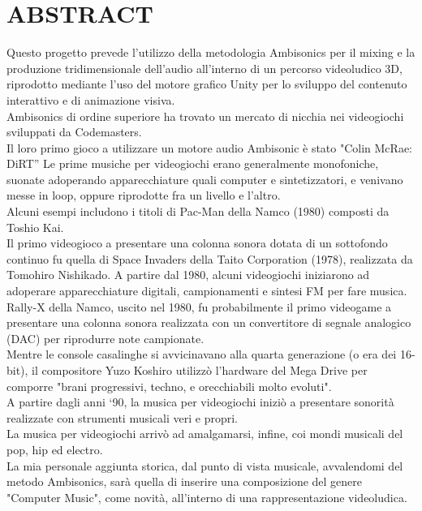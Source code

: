 
\chapter{ABSTRACT}
\label{chp:abstract}

Questo progetto prevede l'utilizzo della metodologia Ambisonics per il mixing e la produzione tridimensionale dell'audio all'interno di un percorso videoludico 3D, riprodotto mediante l'uso del motore grafico Unity per lo sviluppo del contenuto interattivo e di animazione visiva. \\
Ambisonics di ordine superiore ha trovato un mercato di nicchia nei videogiochi sviluppati da Codemasters. \\
 Il loro primo gioco a utilizzare un motore audio Ambisonic è stato "Colin McRae: DiRT”
Le prime musiche per videogiochi erano generalmente monofoniche, suonate adoperando apparecchiature quali computer e sintetizzatori, e venivano messe in loop, oppure riprodotte fra un livello e l'altro. \\
Alcuni esempi includono i titoli di Pac-Man della Namco (1980) composti da Toshio Kai. \\
 Il primo videogioco a presentare una colonna sonora dotata di un sottofondo continuo fu quella di Space Invaders della Taito Corporation (1978), realizzata da Tomohiro Nishikado. A partire dal 1980, alcuni videogiochi iniziarono ad adoperare apparecchiature digitali, campionamenti e sintesi FM per fare musica. \\
Rally-X della Namco, uscito nel 1980,
fu probabilmente il primo videogame a presentare una colonna sonora realizzata con un convertitore di segnale analogico (DAC) per riprodurre note campionate. \\
Mentre le console casalinghe si avvicinavano alla quarta generazione (o era dei 16-bit),
il compositore Yuzo Koshiro utilizzò l'hardware del Mega Drive per comporre "brani progressivi, techno, e orecchiabili molto evoluti". \\
A partire dagli anni `90, la musica per videogiochi iniziò a presentare sonorità realizzate con strumenti musicali veri e propri. \\
La musica per videogiochi arrivò ad amalgamarsi, infine, coi mondi musicali del pop, hip ed electro. \\
La mia personale aggiunta storica, dal punto di vista musicale, avvalendomi del metodo Ambisonics, sarà quella di inserire una composizione del genere "Computer Music", come novità, all'interno di una rappresentazione videoludica. \\
